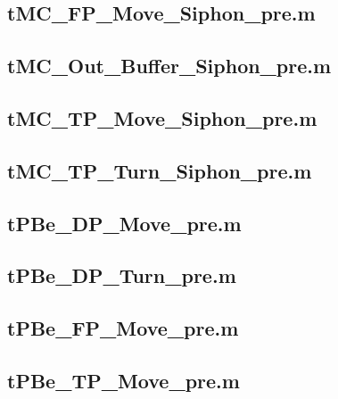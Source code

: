 \documentclass[runningheads,a4paper]{llncs}
\newcommand{\GPenSIM}{../GPenSIM}
\begin{document}
\subsection{tMC\_FP\_Move\_Siphon\_pre.m}
\label{app:tMC_FP_Move_Siphon_pre.m}


\subsection{tMC\_Out\_Buffer\_Siphon\_pre.m}
\label{app:tMC_Out_Buffer_Siphon_pre.m}


\subsection{tMC\_TP\_Move\_Siphon\_pre.m}
\label{app:tMC_TP_Move_Siphon_pre.m}


\subsection{tMC\_TP\_Turn\_Siphon\_pre.m}
\label{app:tMC_TP_Turn_Siphon_pre.m}


\subsection{tPBe\_DP\_Move\_pre.m}
\label{app:tPBe_DP_Move_pre.m}


\subsection{tPBe\_DP\_Turn\_pre.m}
\label{app:tPBe_DP_Turn_pre.m}


\subsection{tPBe\_FP\_Move\_pre.m}
\label{app:tPBe_FP_Move_pre.m}


\subsection{tPBe\_TP\_Move\_pre.m}
\label{app:tPBe_TP_Move_pre.m}

\end{document}
